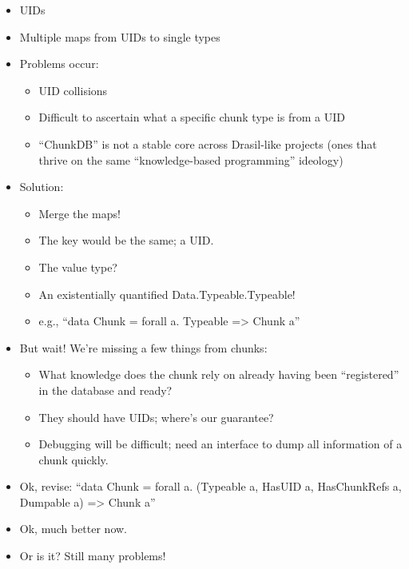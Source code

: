 \begin{itemize}
    \item UIDs
    \item Multiple maps from UIDs to single types
    \item Problems occur:
          \begin{itemize}
              \item UID collisions
              \item Difficult to ascertain what a specific chunk type is from a
                    UID
              \item ``ChunkDB'' is not a stable core across Drasil-like projects
                    (ones that thrive on the same ``knowledge-based programming''
                    ideology)
          \end{itemize}
    \item Solution:
          \begin{itemize}
              \item Merge the maps!
              \item The key would be the same; a UID.
              \item The value type?
              \item An existentially quantified Data.Typeable.Typeable!
              \item e.g., ``data Chunk = forall a. Typeable => Chunk a''
          \end{itemize}
    \item But wait! We're missing a few things from chunks:
          \begin{itemize}
              \item What knowledge does the chunk rely on already having been
                    ``registered'' in the database and ready?
              \item They should have UIDs; where's our guarantee?
              \item Debugging will be difficult; need an interface to dump all
                    information of a chunk quickly.
          \end{itemize}
    \item Ok, revise: ``data Chunk = forall a. (Typeable a, HasUID a,
          HasChunkRefs a, Dumpable a) => Chunk a''
    \item Ok, much better now.
    \item Or is it? Still many problems!
          \begin{itemize}

\end{itemize}
\end{itemize}
